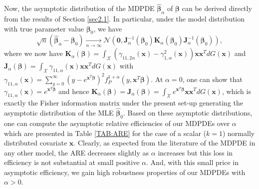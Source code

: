 \documentclass[a4paper]{article}%
\newtheorem{corollary}[theorem]{Corollary}
\begin{document}
Now, the asymptotic distribution of the MDPDE $\widehat{\boldsymbol{\beta}%
}_{\alpha}$ of $\boldsymbol{\beta}$ can be derived directly from the results of  Section
\ref{sec2.1}. In particular, under the model distribution with true parameter
value $\boldsymbol{\beta}_{0}$, we have 
\[
\sqrt{n}(\widehat{\boldsymbol{\beta}}_{\alpha}-\boldsymbol{\beta}_{0})
\underset{n\rightarrow\infty}{\longrightarrow} \mathcal{N}(\boldsymbol{0}%
,\boldsymbol{J}_{\alpha}^{-1}(\boldsymbol{\beta}_{0})\boldsymbol{K}_{\alpha
}(\boldsymbol{\beta}_{0}) \boldsymbol{J}_{\alpha}^{-1}(\boldsymbol{\beta}%
_{0})),
\]
where we now have $\boldsymbol{K}_{\alpha}(\boldsymbol{\beta}) ={\int%
_{\mathcal{X}}}\left(  \gamma_{11,2\alpha}(\boldsymbol{x})-\gamma_{1,\alpha
}^{2}(\boldsymbol{x})\right)  \boldsymbol{x}\boldsymbol{x}^{T}%
dG(\boldsymbol{x})$ and $\boldsymbol{J}_{\alpha}(\boldsymbol{\beta})
={\int_{\mathcal{X}}}\gamma_{11,\alpha}(\boldsymbol{x})\boldsymbol{x}%
\boldsymbol{x}^{T}dG(\boldsymbol{x}) $
with $\gamma_{11,\alpha}(\boldsymbol{x}) = \displaystyle\sum_{y=0}^{\infty} (y
- e^{\boldsymbol{x}^{T}\boldsymbol{\beta}})^{2} f_{P}^{1+\alpha}%
(y,\boldsymbol{x}^{T}\boldsymbol{\beta}).$ At $\alpha=0$, one can show that
$\gamma_{11,\alpha}(\boldsymbol{x})=e^{\boldsymbol{x}^{T}\boldsymbol{\beta}}$
and hence $\boldsymbol{K}_{\alpha}(\boldsymbol{\beta})= \boldsymbol{J}%
_{\alpha}(\boldsymbol{\beta}) ={\int_{\mathcal{X}}}e^{\boldsymbol{x}%
^{T}\boldsymbol{\beta}}\boldsymbol{x}\boldsymbol{x}^{T}dG(\boldsymbol{x})$,
which is exactly the Fisher information matrix under the present set-up generating
the asymptotic distribution of the MLE $\widehat{\boldsymbol{\beta}}_{0}$.
Based on these asymptotic distributions, one can compute the asymptotic
relative efficiencies of our MDPDEs over $\alpha$ which are presented in Table
\ref{TAB:ARE} for the case of a scalar ($k=1$) normally distributed covariate
$\boldsymbol{x}$. Clearly, as expected from the literature of the
MDPDE in any other model, the ARE decreases slightly as $\alpha$ increases but
this loss in efficiency is not substantial at small positive $\alpha$. And,
with this small price in asymptotic efficiency, we gain high robustness
properties of our MDPDEs with $\alpha>0$.
\end{document}
